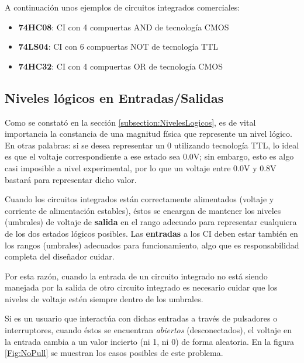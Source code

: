 \vspace{20pt}
A continuación unos ejemplos de circuitos integrados comerciales:

\begin{itemize}
    \item \textbf{74HC08}: CI con 4 compuertas AND de tecnología CMOS
    \item \textbf{74LS04}: CI con 6 compuertas NOT de tecnología TTL
    \item \textbf{74HC32}: CI con 4 compuertas OR de tecnología CMOS
\end{itemize}


\subsection{Niveles lógicos en Entradas/Salidas}
Como se constató en la sección \ref{subsection:NivelesLogicos}, es de vital importancia la constancia de una magnitud física que represente un nivel lógico.
En otras palabras: si se desea representar un $0$ utilizando tecnología TTL, lo ideal es que el voltaje correspondiente a ese estado sea 0.0V; sin embargo, esto
es algo casi imposible a nivel experimental, por lo que un voltaje entre 0.0V y 0.8V bastará para representar dicho valor.

Cuando los circuitos integrados están correctamente alimentados (voltaje y corriente de alimentación estables), éstos se encargan de mantener los niveles (umbrales) de voltaje de \textbf{salida} en el rango adecuado para representar
cualquiera de los dos estados lógicos posibles. Las \textbf{entradas} a los CI deben estar también en los rangos (umbrales) adecuados para funcionamiento, algo que es responsabilidad completa del diseñador cuidar.

Por esta razón, cuando la entrada de un circuito integrado no está siendo manejada por la salida de otro circuito integrado es necesario cuidar que los niveles de voltaje estén siempre dentro de los umbrales.

Si es un usuario que interactúa con dichas entradas a través de pulsadores o interruptores, cuando éstos se encuentran \emph{abiertos} (desconectados), el voltaje en la entrada cambia a un valor incierto (ni 1, ni 0)
de forma aleatoria. En la figura \ref{Fig:NoPull} se muestran los casos posibles de este problema.

